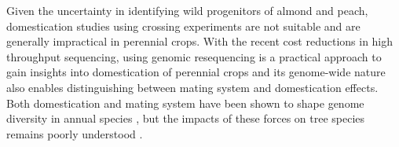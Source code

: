 \documentclass[12pt]{article}
\begin{document}
%
Given the uncertainty in identifying wild progenitors of almond and peach, domestication studies using crossing experiments are not suitable and are generally impractical in perennial crops.
%
With the recent cost reductions in high throughput sequencing, using genomic resequencing is a practical approach to gain insights into domestication of perennial crops and its genome-wide nature also enables distinguishing between mating system and domestication effects. 
%
Both domestication and mating system have been shown to shape genome diversity in annual species \citep{glemin2006impact, doebley2006molecular, slotte2013capsella}, but the impacts of these forces on tree species remains poorly understood \citep{mckey2010evolutionary, miller2011forest}.
\end{document}
